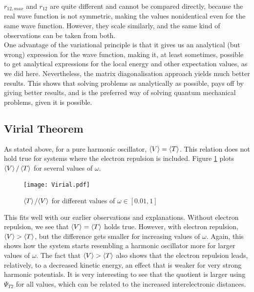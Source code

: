 \documentclass[10pt,a4paper]{article}
\begin{document}
$r_{12,max}$ and $r_{12}$ are quite different and cannot be compared directly, because the real wave function is not symmetric, making the values nonidentical even for the same wave function. However, they scale similarly, and the same kind of observations can be taken from both. \\
One advantage of the variational principle is that it gives us an analytical (but wrong) expression for the wave function, making it, at least sometimes, possible to get analytical expressions for the local energy and other expectation values, as we did here. Nevertheless, the matrix diagonalisation approach yields much better results. This shows that solving problems as analytically as possible, pays off by giving better results, and is the preferred way of solving quantum mechanical problems, given it is possible.  
\subsection{Virial Theorem}
As stated above, for a pure harmonic oscillator, $\braket{V}=\braket{T}$. This relation does not hold true for systems where the electron repulsion is included. Figure \ref{Virial} plots $\braket{V}/\braket{T}$ for several values of $\omega$.
\begin{figure}[H]
\centering
\texttt{[image: Virial.pdf]}
\caption[$\braket{T}$/$0\braket{V}$ as function of $\omega$]{$\braket{T}$/$\braket{V}$ for different values of $\omega\in[0.01,1]$}\label{Virial}
\end{figure}
This fits well with our earlier observations and explanations. Without electron repulsion, we see that $\braket{V}=\braket{T}$ holds true. However, with electron repulsion, $\braket{V}>\braket{T}$, but the difference gets smaller for increasing values of $\omega$. Again, this shows how the system starts resembling a harmonic oscillator more for larger values of $\omega$. The fact that $\braket{V}>\braket{T}$ also shows that the electron repulsion leads, relatively, to a decreased kinetic energy, an effect that is weaker for very strong harmonic potentials. It is very interesting to see that the quotient is larger using $\Psi_{T2}$ for all values, which can be related to the increased interelectronic distances. 
\end{document}
